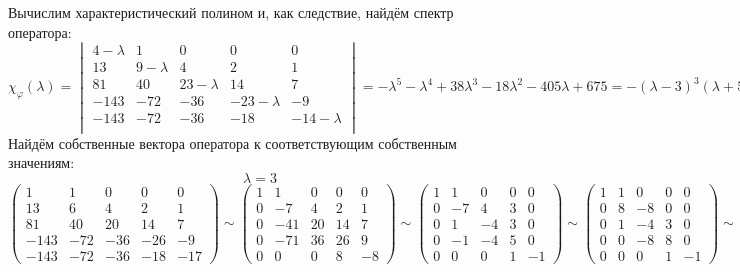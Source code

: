 \documentclass{article}
\newcommand{\la}{\lambda}
\begin{document}
\begin{center}
Вычислим характеристический полином и, как следствие, найдём спектр оператора:
$$\chi_\varphi(\la) = \begin{vmatrix}
4-\la & 1 & 0 & 0 & 0 \\
13 & 9-\la & 4 & 2 & 1 \\
81 & 40 & 23-\la & 14 & 7 \\
-143 & -72 & -36 & -23-\la & -9 \\
-143 & -72 & -36 & -18 & -14-\la \\
\end{vmatrix} = -\la^5-\la^4+38\la^3-18\la^2-405\la+675 = -(\la - 3)^3(\la + 5)^2 \Rightarrow \sigma_\varphi = \left\{3^{(3)}, -5^{(2)}\right\}$$
Найдём собственные вектора оператора к соответствующим собственным значениям:
$$\la = 3$$
$$\begin{pmatrix}
1 & 1 & 0 & 0 & 0 \\
13 & 6 & 4 & 2 & 1 \\
81 & 40 & 20 & 14 & 7 \\
-143 & -72 & -36 & -26 & -9 \\
-143 & -72 & -36 & -18 & -17
\end{pmatrix} \sim \begin{pmatrix}
1 & 1 & 0 & 0 & 0 \\
0 & -7 & 4 & 2 & 1 \\
0 & -41 & 20 & 14 & 7 \\
0 & -71 & 36 & 26 & 9 \\
0 & 0 & 0 & 8 & -8
\end{pmatrix} \sim \begin{pmatrix}
1 & 1 & 0 & 0 & 0 \\
0 & -7 & 4 & 3 & 0 \\
0 & 1 & -4 & 3 & 0 \\
0 & -1 & -4 & 5 & 0 \\
0 & 0 & 0 & 1 & -1
\end{pmatrix} \sim \begin{pmatrix}
1 & 1 & 0 & 0 & 0 \\
0 & 8 & -8 & 0 & 0 \\
0 & 1 & -4 & 3 & 0 \\
0 & 0 & -8 & 8 & 0 \\
0 & 0 & 0 & 1 & -1
\end{pmatrix} \sim \begin{pmatrix}
1 & 1 & 0 & 0 & 0 \\
0 & 1 & -1 & 0 & 0 \\
0 & 0 & -3 & 3 & 0 \\

\end{pmatrix}$$
\end{center}
\end{document}
